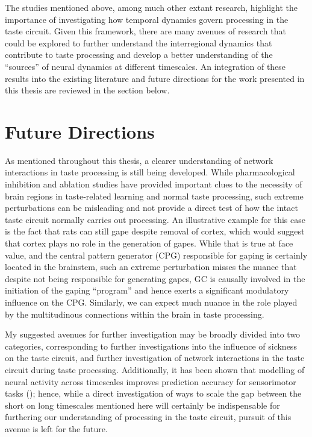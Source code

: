 \begin{refsection}
The studies mentioned above, among much other extant research, highlight the importance of investigating how temporal dynamics govern processing in the taste circuit. Given this framework, there are many avenues of research that could be explored to further understand the interregional dynamics that contribute to taste processing and develop a better understanding of the “sources” of neural dynamics at different timescales. An integration of these results into the existing literature and future directions for the work presented in this thesis are reviewed in the section below.

\section{Future Directions}
As mentioned throughout this thesis, a clearer understanding of network interactions in taste processing is still being developed. While pharmacological inhibition and ablation studies have provided important clues to the necessity of brain regions in taste-related learning and normal taste processing, such extreme perturbations can be misleading and not provide a direct test of how the intact taste circuit normally carries out processing. An illustrative example for this case is the fact that rats can still gape despite removal of cortex, which would suggest that cortex plays no role in the generation of gapes. While that is true at face value, and the central pattern generator (CPG) responsible for gaping is certainly located in the brainstem, such an extreme perturbation misses the nuance that despite not being responsible for generating gapes, GC is causally involved in the initiation of the gaping “program” and hence exerts a significant modulatory influence on the CPG. Similarly, we can expect much nuance in the role played by the multitudinous connections within the brain in taste processing.

My suggested avenues for further investigation may be broadly divided into two categories, corresponding to further investigations into the influence of sickness on the taste circuit, and further investigation of network interactions in the taste circuit during taste processing. Additionally, it has been shown that modelling of neural activity across timescales improves prediction accuracy for sensorimotor tasks (\cite{samek2016a,abbaspourazad2021a}); hence, while a direct investigation of ways to scale the gap between the short on long timescales mentioned here will certainly be indispensable for furthering our understanding of processing in the taste circuit, pursuit of this avenue is left for the future.


\end{refsection}

